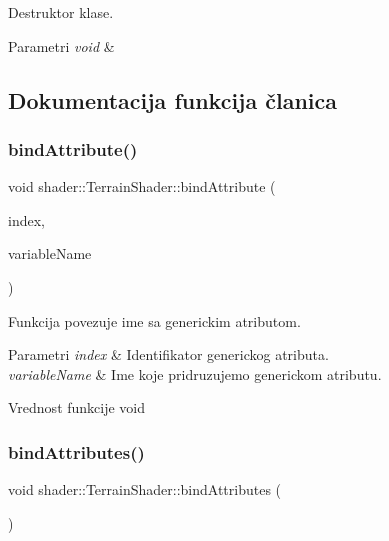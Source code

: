 Destruktor klase. 


\begin{DoxyParams}{Parametri}
{\em void} & \\
\hline
\end{DoxyParams}


\subsection{Dokumentacija funkcija članica}
\mbox{\label{classshader_1_1TerrainShader_ae414b98f36de2a58d9c7f18ae6b9880a}} 
\subsubsection{\texorpdfstring{bind\+Attribute()}{bindAttribute()}}
{\footnotesize\ttfamily void shader\+::\+Terrain\+Shader\+::bind\+Attribute (\begin{DoxyParamCaption}\item[{int}]{index,  }\item[{const char $\ast$}]{variable\+Name }\end{DoxyParamCaption})}



Funkcija povezuje ime sa generickim atributom. 


\begin{DoxyParams}{Parametri}
{\em index} & Identifikator generickog atributa. \\
\hline
{\em variable\+Name} & Ime koje pridruzujemo generickom atributu. \\
\hline
\end{DoxyParams}
\begin{DoxyReturn}{Vrednost funkcije}
void 
\end{DoxyReturn}
\mbox{\label{classshader_1_1TerrainShader_afca63864591afe38d57ff8ae39aa8911}} 
\subsubsection{\texorpdfstring{bind\+Attributes()}{bindAttributes()}}
{\footnotesize\ttfamily void shader\+::\+Terrain\+Shader\+::bind\+Attributes (\begin{DoxyParamCaption}\item[{void}]{ }\end{DoxyParamCaption})}



